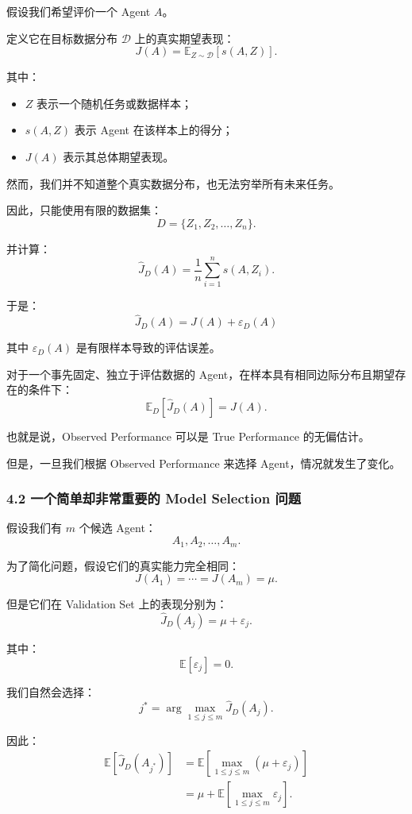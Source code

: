 假设我们希望评价一个 Agent \(A\)。

定义它在目标数据分布 \(\mathcal D\) 上的真实期望表现：
\[J(A)
=
\mathbb E_{Z\sim\mathcal D}[s(A,Z)].\]

其中：

\begin{itemize}
\tightlist
\item
  \(Z\) 表示一个随机任务或数据样本；
\item
  \(s(A,Z)\) 表示 Agent 在该样本上的得分；
\item
  \(J(A)\) 表示其总体期望表现。
\end{itemize}

然而，我们并不知道整个真实数据分布，也无法穷举所有未来任务。

因此，只能使用有限的数据集：
\[D=\{Z_1,Z_2,\ldots,Z_n\}.\]

并计算：
\[\widehat J_D(A)
=
\frac{1}{n}
\sum_{i=1}^{n}s(A,Z_i).\]

于是：
\[\boxed{
\widehat J_D(A)=J(A)+\varepsilon_D(A)
}\]

其中 \(\varepsilon_D(A)\) 是有限样本导致的评估误差。

对于一个事先固定、独立于评估数据的 Agent，在样本具有相同边际分布且期望存在的条件下：
\[\mathbb E_D[\widehat J_D(A)]=J(A).\]

也就是说，Observed Performance 可以是 True Performance 的无偏估计。

但是，一旦我们根据 Observed Performance 来选择 Agent，情况就发生了变化。

\hypertarget{part-1-03-0001-ux4e00ux4e2aux7b80ux5355ux5374ux975eux5e38ux91cdux8981ux7684-model-selection-ux95eeux9898}{%
\subsubsection{4.2 一个简单却非常重要的 Model Selection 问题}\label{part-1-03-0001-ux4e00ux4e2aux7b80ux5355ux5374ux975eux5e38ux91cdux8981ux7684-model-selection-ux95eeux9898}}

假设我们有 \(m\) 个候选 Agent：
\[A_1,A_2,\ldots,A_m.\]

为了简化问题，假设它们的真实能力完全相同：
\[J(A_1)=\cdots=J(A_m)=\mu.\]

但是它们在 Validation Set 上的表现分别为：
\[\widehat J_D(A_j)=\mu+\varepsilon_j.\]

其中：
\[\mathbb E[\varepsilon_j]=0.\]

我们自然会选择：
\[j^*=
\arg\max_{1\leq j\leq m}
\widehat J_D(A_j).\]

因此：
\[\begin{aligned}
\mathbb E[\widehat J_D(A_{j^*})]
&=
\mathbb E\left[
\max_{1\leq j\leq m}
(\mu+\varepsilon_j)
\right]\\
&=
\mu+
\mathbb E\left[
\max_{1\leq j\leq m}\varepsilon_j
\right].
\end{aligned}\]

